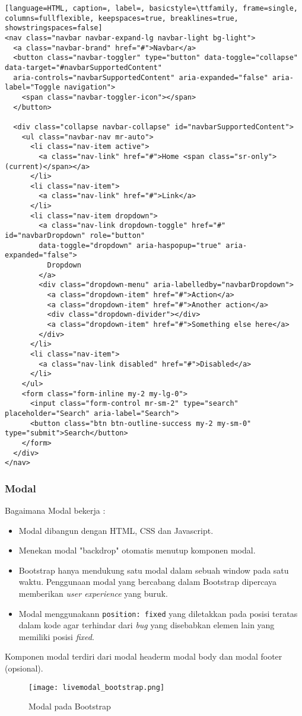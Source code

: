 \begin{lstlisting}[language=HTML, caption=, label=, basicstyle=\ttfamily, frame=single, columns=fullflexible, keepspaces=true, breaklines=true, showstringspaces=false]  
<nav class="navbar navbar-expand-lg navbar-light bg-light">
  <a class="navbar-brand" href="#">Navbar</a>
  <button class="navbar-toggler" type="button" data-toggle="collapse" data-target="#navbarSupportedContent" 
  aria-controls="navbarSupportedContent" aria-expanded="false" aria-label="Toggle navigation">
    <span class="navbar-toggler-icon"></span>
  </button>

  <div class="collapse navbar-collapse" id="navbarSupportedContent">
    <ul class="navbar-nav mr-auto">
      <li class="nav-item active">
        <a class="nav-link" href="#">Home <span class="sr-only">(current)</span></a>
      </li>
      <li class="nav-item">
        <a class="nav-link" href="#">Link</a>
      </li>
      <li class="nav-item dropdown">
        <a class="nav-link dropdown-toggle" href="#" id="navbarDropdown" role="button" 
        data-toggle="dropdown" aria-haspopup="true" aria-expanded="false">
          Dropdown
        </a>
        <div class="dropdown-menu" aria-labelledby="navbarDropdown">
          <a class="dropdown-item" href="#">Action</a>
          <a class="dropdown-item" href="#">Another action</a>
          <div class="dropdown-divider"></div>
          <a class="dropdown-item" href="#">Something else here</a>
        </div>
      </li>
      <li class="nav-item">
        <a class="nav-link disabled" href="#">Disabled</a>
      </li>
    </ul>
    <form class="form-inline my-2 my-lg-0">
      <input class="form-control mr-sm-2" type="search" placeholder="Search" aria-label="Search">
      <button class="btn btn-outline-success my-2 my-sm-0" type="submit">Search</button>
    </form>
  </div>
</nav>
\end{lstlisting}

\subsubsection{Modal}
Bagaimana Modal bekerja :
\begin{itemize}
\item Modal dibangun dengan HTML, CSS dan Javascript. 
\item Menekan modal "backdrop" otomatis menutup komponen modal.
\item Bootstrap hanya mendukung satu modal dalam sebuah window pada satu waktu. Penggunaan modal yang bercabang dalam Bootstrap dipercaya memberikan \textit{user experience} yang buruk.
\item Modal menggunakann \texttt{position: fixed} yang diletakkan pada posisi teratas dalam kode agar terhindar dari \textit{bug} yang disebabkan elemen lain yang memiliki posisi \textit{fixed}. 
\end{itemize}
Komponen modal terdiri dari modal headerm modal body dan modal footer (opsional).
\begin{figure} [H]
	\centering  
	\texttt{[image: livemodal\_bootstrap.png]}  
	\caption{Modal pada Bootstrap} 
\end{figure}

